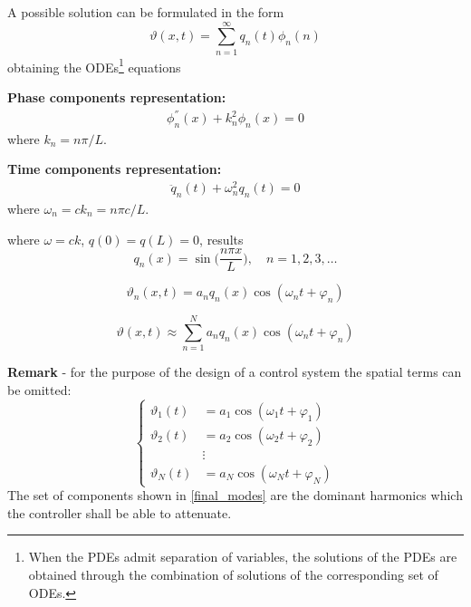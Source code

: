 \documentclass[12pt,a4paper]{scrartcl}
\begin{document}
\begin{onehalfspace}
A possible solution can be formulated in the form 
\begin{equation}
	\vartheta(x,t) = \sum_{n=1}^{\infty}q_n(t)\phi_n(n) 
\end{equation}
obtaining the ODEs\footnote{When the PDEs admit separation of variables, the solutions of the PDEs are obtained through the combination of solutions of the corresponding set of ODEs.} equations
\begin{mybox}
	\noindent\textbf{Phase components representation:}
	\begin{equation}
		\begin{aligned}
			\phi_n^{''}(x) + k_n^2 \phi_n(x) = 0
		\end{aligned}
	\end{equation}
	where $k_n = {n\pi}/{L}$.
\end{mybox}
\begin{mybox}
	\noindent\textbf{Time components representation:}
	\begin{equation}
		\begin{aligned}
			\ddot{q}_n(t) + \omega_n^2 q_n(t) = 0
		\end{aligned}
	\end{equation}
	where $\omega_n = ck_n = {n\pi c}/{L}$.	
\end{mybox}
where $\omega = ck$, $q(0) = q(L) = 0$, results
\begin{equation}
	q_n(x) = \sin\Big(\frac{n\pi x}{L}\Big), \quad n=1,2,3,\dots 
\end{equation}

\begin{equation}
	\vartheta_n(x,t) = a_n q_n(x)\cos(\omega_n t + \varphi_n)
\end{equation}

\begin{equation}
	\vartheta(x,t) \approx \sum_{n=1}^{N} a_n q_n(x)\cos(\omega_n t + \varphi_n)
\end{equation}
\begin{mybox}
	\noindent\textbf{Remark} - for the purpose of  the design of a control system the spatial terms can be omitted:
	\begin{equation}\label{final_modes}
		\left\lbrace 
		\begin{aligned}
			\vartheta_1(t) &= a_1 \cos(\omega_1 t + \varphi_1) \\[6pt]
			\vartheta_2(t) &= a_2 \cos(\omega_2 t + \varphi_2) \\[6pt]
			& \vdots \\[6pt]
			\vartheta_N(t) &= a_N \cos(\omega_N t + \varphi_N)
		\end{aligned}
		\right. 
	\end{equation}
The set of components shown in \eqref{final_modes} are the dominant harmonics which the controller shall be able to attenuate. 
\end{mybox}



\end{onehalfspace}
\end{document}
